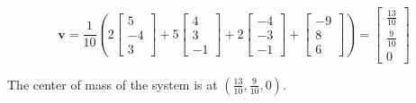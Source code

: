 \documentclass{mathhomework}
\newcommand{\Vect}[1]{\pmb{#1}}
\begin{document}
\begin{problem}[1.3\#29]
    \begin{solution}
        \begin{equation*}
            \Vect{v} = \frac{1}{10}(2\begin{bmatrix}
                5 \\ -4 \\ 3
            \end{bmatrix} + 5 \begin{bmatrix}
                4 \\ 3 \\ -1
            \end{bmatrix} + 2 \begin{bmatrix}
                -4 \\ -3 \\ -1
            \end{bmatrix} + \begin{bmatrix}
                -9 \\ 8 \\ 6
            \end{bmatrix}) = \begin{bmatrix}
                \frac{13}{10} \\ \frac{9}{10} \\ 0
            \end{bmatrix}
        \end{equation*}

        The center of mass of the system is at $(\frac{13}{10}, \frac{9}{10}, 0)$.
    \end{solution}
\end{problem}
\end{document}
